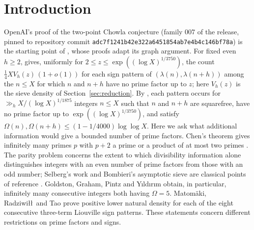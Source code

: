 \documentclass[11pt]{article}
\theoremstyle{definition}
\theoremstyle{remark}
\numberwithin{equation}{section}
\begin{document}
\section{Introduction}\label{sec:intro}
OpenAI's proof of the two-point Chowla conjecture \cite{OpenAI007} (family 007 of the release, pinned to
repository commit \texttt{adc7f1241b42e322a6451854ab7e4b4c146bf78a}) is the starting point of
\cite{Guo2026RoughPairsFixedDistance}, whose proofs adapt its graph argument. For fixed even $h\ge2$,
\cite[Theorem~1.1]{Guo2026RoughPairsFixedDistance} gives, uniformly for $2\le z\le\exp((\log X)^{1/3750})$, the count
$\frac14XV_h(z)\,(1+o(1))$ for each sign pattern of $(\lambda(n),\lambda(n+h))$ among the $n\le X$ for which
$n$ and $n+h$ have no prime factor up to $z$; here $V_h(z)$ is the sieve density of Section~\ref{sec:reduction}.
By \cite[Theorem~1.2]{Guo2026RoughPairsFixedDistance}, each pattern occurs for $\gg_hX/(\log X)^{1/1875}$ integers
$n\le X$ such that $n$ and $n+h$ are squarefree, have no prime factor up to $\exp((\log X)^{1/3750})$, and satisfy
$\Omega(n),\Omega(n+h)\le(1-1/4000)\log\log X$. Here we ask what additional information would give a bounded number
of prime factors. Chen's theorem gives infinitely many primes $p$ with $p+2$ a prime or a product of
at most two primes \cite{Chen}. The parity problem concerns the extent to which divisibility information alone distinguishes integers
with an even number of prime factors from those with an odd number; Selberg's work and Bombieri's
asymptotic sieve are classical points of reference \cite{Selberg,Bombieri,Opera}. Goldston, Graham, Pintz and Y\i ld\i r\i m
\cite{GGPPY} obtain, in particular, infinitely many consecutive integers both having $\Omega=5$.
Matom\"aki, Radziwi\l\l\ and Tao \cite{MRTpatterns} prove positive lower natural density for each of the
eight consecutive three-term Liouville sign patterns. These statements concern different restrictions on
prime factors and signs.
\end{document}
